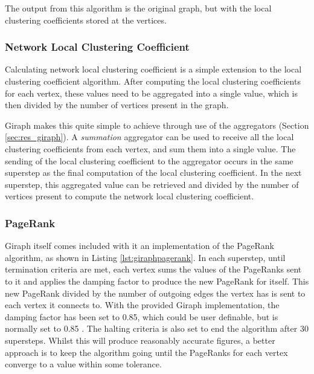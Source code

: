 The output from this algorithm is the original graph, but with the local clustering coefficients stored at the vertices.

\subsubsection{Network Local Clustering Coefficient}
Calculating network local clustering coefficient is a simple extension to the local clustering coefficient algorithm. After computing the local clustering coefficients for each vertex, these values need to be aggregated into a single value, which is then divided by the number of vertices present in the graph.

Giraph makes this quite simple to achieve through use of the aggregators (Section \ref{sec:res_giraph}). A \emph{summation} aggregator can be used to receive all the local clustering coefficients from each vertex, and sum them into a single value. The sending of the local clustering coefficient to the aggregator occurs in the same superstep as the final computation of the local clustering coefficient. In the next superstep, this aggregated value can be retrieved and divided by the number of vertices present to compute the network local clustering coefficient.

\subsubsection{PageRank}
Giraph itself comes included with it an implementation of the PageRank algorithm, as shown in Listing \ref{lst:giraphpagerank}. In each superstep, until termination criteria are met, each vertex sums the values of the PageRanks sent to it and applies the damping factor to produce the new PageRank for itself. This new PageRank divided by the number of outgoing edges the vertex has is sent to each vertex it connects to. With the provided Giraph implementation, the damping factor has been set to 0.85, which could be user definable, but is normally set to 0.85 \cite{brin98}. The halting criteria is also set to end the algorithm after 30 supersteps. Whilst this will produce reasonably accurate figures, a better approach is to keep the algorithm going until the PageRanks for each vertex converge to a value within some tolerance.


